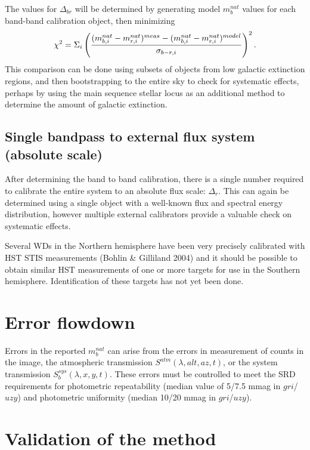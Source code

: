 \documentclass[12pt,preprint]{aastex}
\begin{document}
The values for $\Delta_{br}$ will be determined by generating model
$m_b^{nat}$ values for each band-band calibration object, then
minimizing 
\begin{equation}
\chi^2 = \Sigma_{i} \left( { (m_{b,i}^{nat} - m_{r,i}^{nat})^{meas} - (m_{b,i}^{nat}
    - m_{r,i}^{nat})^{model} \over  \sigma_{b-r,i}}\right) ^2. 
\end{equation}
This comparison can
be done using subsets of objects from low galactic extinction regions,
and then bootstrapping to the entire sky to check for systematic
effects, perhaps by using the main sequence stellar locus as an
additional method to determine the amount of galactic extinction. 

\subsection{Single bandpass to external flux system (absolute scale)}

After determining the band to band calibration, there is a single
number required to calibrate the entire system to an absolute flux
scale: $\Delta_r$.  This can again be determined using a single
object with a well-known flux and spectral energy distribution,
however multiple external calibrators provide a valuable check on
systematic effects. 

Several WDs in the Northern hemisphere have been very precisely
calibrated with HST STIS measurements (Bohlin \& Gilliland 2004) and
it should be possible to obtain similar HST measurements of one or
more targets for use in the Southern hemisphere. Identification of
these targets has not yet been done. 

\section{Error flowdown}

Errors in the reported $m_b^{nat}$ can arise from the errors in
measurement of counts in the image, the atmospheric transmission
$S^{atm}(\lambda,alt,az,t)$, or the system transmission
$S_b^{sys}(\lambda,x,y,t)$.  These errors must be controlled to meet
the SRD requirements for photometric repeatability (median value of
5/7.5 mmag in $gri$/$uzy$) and photometric uniformity (median 10/20
mmag in $gri$/$uzy$).





\section{Validation of the method}
\end{document}
